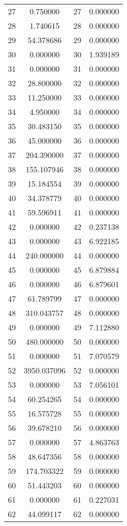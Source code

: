 \documentclass[12pt]{article}
\begin{document}
\begin{longtable}{@{}cccc@{}}
27 & 0.750000 & 27 & 0.000000 \\
28 & 1.740615 & 28 & 0.000000 \\
29 & 54.378686 & 29 & 0.000000 \\
30 & 0.000000 & 30 & 1.939189 \\
31 & 0.000000 & 31 & 0.000000 \\
32 & 28.800000 & 32 & 0.000000 \\
33 & 11.250000 & 33 & 0.000000 \\
34 & 4.950000 & 34 & 0.000000 \\
35 & 30.483150 & 35 & 0.000000 \\
36 & 45.000000 & 36 & 0.000000 \\
37 & 204.390000 & 37 & 0.000000 \\
38 & 155.107946 & 38 & 0.000000 \\
39 & 15.184554 & 39 & 0.000000 \\
40 & 34.378779 & 40 & 0.000000 \\
41 & 59.596911 & 41 & 0.000000 \\
42 & 0.000000 & 42 & 0.237138 \\
43 & 0.000000 & 43 & 6.922185 \\
44 & 240.000000 & 44 & 0.000000 \\
45 & 0.000000 & 45 & 6.879884 \\
46 & 0.000000 & 46 & 6.879601 \\
47 & 61.789799 & 47 & 0.000000 \\
48 & 310.043757 & 48 & 0.000000 \\
49 & 0.000000 & 49 & 7.112880 \\
50 & 480.000000 & 50 & 0.000000 \\
51 & 0.000000 & 51 & 7.070579 \\
52 & 3950.037096 & 52 & 0.000000 \\
53 & 0.000000 & 53 & 7.056101 \\
54 & 60.254265 & 54 & 0.000000 \\
55 & 16.575728 & 55 & 0.000000 \\
56 & 39.678210 & 56 & 0.000000 \\
57 & 0.000000 & 57 & 4.863763 \\
58 & 48.647356 & 58 & 0.000000 \\
59 & 174.703322 & 59 & 0.000000 \\
60 & 51.443203 & 60 & 0.000000 \\
61 & 0.000000 & 61 & 0.227031 \\
62 & 44.099117 & 62 & 0.000000 \\

\end{longtable}
\end{document}

